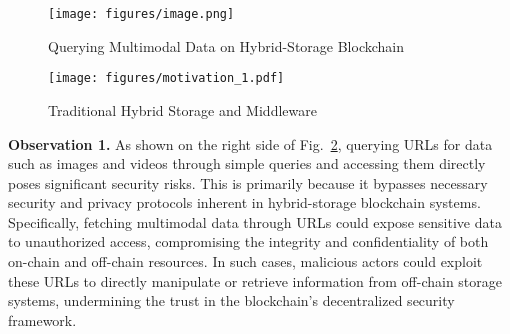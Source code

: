 

\begin{figure}[htbp]
    \centering
    \texttt{[image: figures/image.png]}
    \caption{Querying Multimodal Data on Hybrid-Storage Blockchain}
    \label{fig:motivation}
\end{figure}


\begin{figure}[htbp]
    \centering
    \texttt{[image: figures/motivation\_1.pdf]}
    \caption{Traditional Hybrid Storage and \Chain Middleware}
    \label{fig:motivation_1}
\end{figure}


\textbf{Observation 1.} 
As shown on the right side of Fig.~\ref{fig:motivation_1}, querying URLs for data such as images and videos through simple queries and accessing them directly poses significant security risks.
This is primarily because it bypasses necessary security and privacy protocols inherent in hybrid-storage blockchain systems.
Specifically, fetching multimodal data through URLs could expose sensitive data to unauthorized access, compromising the integrity and confidentiality of both on-chain and off-chain resources. In such cases, malicious actors could exploit these URLs to directly manipulate or retrieve information from off-chain storage systems, undermining the trust in the blockchain's decentralized security framework.


